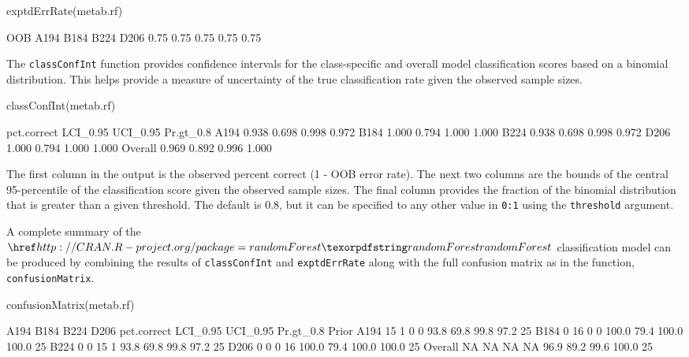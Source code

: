 \begin{Schunk}
\begin{Sinput}
exptdErrRate(metab.rf)
\end{Sinput}
\begin{Soutput}
 OOB A194 B184 B224 D206 
0.75 0.75 0.75 0.75 0.75 
\end{Soutput}
\end{Schunk}

The \texttt{classConfInt} function provides confidence intervals for the
class-specific and overall model classification scores based on a
binomial distribution. This helps provide a measure of uncertainty of
the true classification rate given the observed sample sizes.

\begin{Schunk}
\begin{Sinput}
classConfInt(metab.rf)
\end{Sinput}
\begin{Soutput}
        pct.correct LCI_0.95 UCI_0.95 Pr.gt_0.8
A194          0.938    0.698    0.998     0.972
B184          1.000    0.794    1.000     1.000
B224          0.938    0.698    0.998     0.972
D206          1.000    0.794    1.000     1.000
Overall       0.969    0.892    0.996     1.000
\end{Soutput}
\end{Schunk}

The first column in the output is the observed percent correct (1 - OOB
error rate). The next two columns are the bounds of the central
95-percentile of the classification score given the observed sample
sizes. The final column provides the fraction of the binomial
distribution that is greater than a given threshold. The default is 0.8,
but it can be specified to any other value in \texttt{0:1} using the
\texttt{threshold} argument.

A complete summary of the \(\CRANpkg{randomForest}\) classification
model can be produced by combining the results of \texttt{classConfInt}
and \texttt{exptdErrRate} along with the full confusion matrix as in the
function, \texttt{confusionMatrix}.

\begin{Schunk}
\begin{Sinput}
confusionMatrix(metab.rf)
\end{Sinput}
\begin{Soutput}
        A194 B184 B224 D206 pct.correct LCI_0.95 UCI_0.95 Pr.gt_0.8 Prior
A194      15    1    0    0        93.8     69.8     99.8      97.2    25
B184       0   16    0    0       100.0     79.4    100.0     100.0    25
B224       0    0   15    1        93.8     69.8     99.8      97.2    25
D206       0    0    0   16       100.0     79.4    100.0     100.0    25
Overall   NA   NA   NA   NA        96.9     89.2     99.6     100.0    25
\end{Soutput}
\end{Schunk}

